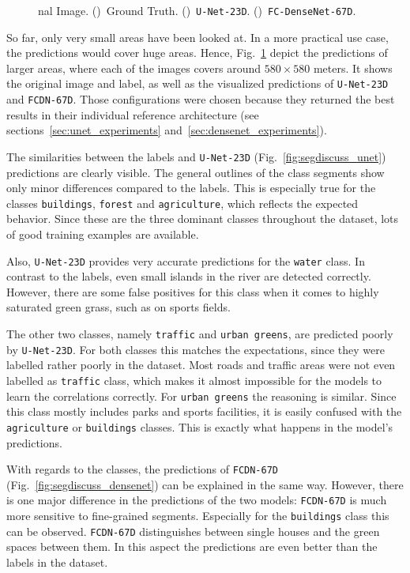 \begin{figure}[h]
{nal Image.
    ()~Ground Truth.
    ()~\texttt{U-Net-23D}.
    ()~\texttt{FC-DenseNet-67D}.
    }
    \label{fig:segmentation_discussion}
\end{figure}

So far, only very small areas have been looked at. In a more practical use case, the predictions would cover huge areas. Hence, Fig.~\ref{fig:segmentation_discussion} depict the predictions of larger areas, where each of the images covers around $580\times 580$ meters. It shows the original image and label, as well as the visualized predictions of \texttt{U-Net-23D} and \texttt{FCDN-67D}. Those configurations were chosen because they returned the best results in their individual reference architecture (see sections~\ref{sec:unet_experiments} and~\ref{sec:densenet_experiments}).

The similarities between the labels and \texttt{U-Net-23D} (Fig.~\ref{fig:segdiscuss_unet}) predictions are clearly visible. The general outlines of the class segments show only minor differences compared to the labels. This is especially true for the classes \texttt{buildings}, \texttt{forest} and \texttt{agriculture}, which reflects the expected behavior. Since these are the three dominant classes throughout the dataset, lots of good training examples are available.

Also, \texttt{U-Net-23D} provides very accurate predictions for the \texttt{water} class. In contrast to the labels, even small islands in the river are detected correctly. However, there are some false positives for this class when it comes to highly saturated green grass, such as on sports fields.

The other two classes, namely \texttt{traffic} and \texttt{urban greens}, are predicted poorly by \texttt{U-Net-23D}. For both classes this matches the expectations, since they were labelled rather poorly in the dataset. Most roads and traffic areas were not even labelled as \texttt{traffic} class, which makes it almost impossible for the models to learn the correlations correctly. For \texttt{urban greens} the reasoning is similar. Since this class mostly includes parks and sports facilities, it is easily confused with the \texttt{agriculture} or \texttt{buildings} classes. This is exactly what happens in the model's predictions.

With regards to the classes, the predictions of \texttt{FCDN-67D} (Fig.~\ref{fig:segdiscuss_densenet})  can be explained in the same way. However, there is one major difference in the predictions of the two models: \texttt{FCDN-67D} is much more sensitive to fine-grained segments. Especially for the \texttt{buildings} class this can be observed. \texttt{FCDN-67D} distinguishes between single houses and the green spaces between them. In this aspect the predictions are even better than the labels in the dataset.

